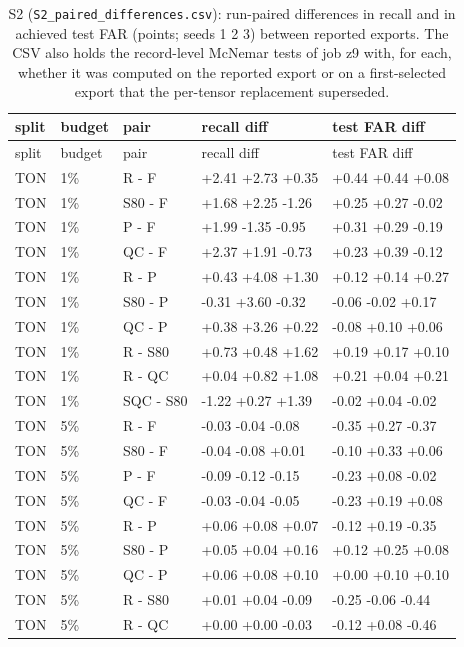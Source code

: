 \documentclass[10pt]{article}
\begin{document}
{\scriptsize
\begin{longtable}{lllll}
\caption{S2 (\texttt{S2\_paired\_differences.csv}): run-paired differences in recall and in achieved test FAR (points; seeds 1 2 3) between reported exports. The CSV also holds the record-level McNemar tests of job z9 with, for each, whether it was computed on the reported export or on a first-selected export that the per-tensor replacement superseded.}\\
\toprule
split & budget & pair & recall diff & test FAR diff \\
\midrule
\endfirsthead
\toprule
split & budget & pair & recall diff & test FAR diff \\
\midrule
\endhead
\bottomrule
\endlastfoot
TON & 1\% & R - F & +2.41 +2.73 +0.35 & +0.44 +0.44 +0.08 \\
TON & 1\% & S80 - F & +1.68 +2.25 -1.26 & +0.25 +0.27 -0.02 \\
TON & 1\% & P - F & +1.99 -1.35 -0.95 & +0.31 +0.29 -0.19 \\
TON & 1\% & QC - F & +2.37 +1.91 -0.73 & +0.23 +0.39 -0.12 \\
TON & 1\% & R - P & +0.43 +4.08 +1.30 & +0.12 +0.14 +0.27 \\
TON & 1\% & S80 - P & -0.31 +3.60 -0.32 & -0.06 -0.02 +0.17 \\
TON & 1\% & QC - P & +0.38 +3.26 +0.22 & -0.08 +0.10 +0.06 \\
TON & 1\% & R - S80 & +0.73 +0.48 +1.62 & +0.19 +0.17 +0.10 \\
TON & 1\% & R - QC & +0.04 +0.82 +1.08 & +0.21 +0.04 +0.21 \\
TON & 1\% & SQC - S80 & -1.22 +0.27 +1.39 & -0.02 +0.04 -0.02 \\
TON & 5\% & R - F & -0.03 -0.04 -0.08 & -0.35 +0.27 -0.37 \\
TON & 5\% & S80 - F & -0.04 -0.08 +0.01 & -0.10 +0.33 +0.06 \\
TON & 5\% & P - F & -0.09 -0.12 -0.15 & -0.23 +0.08 -0.02 \\
TON & 5\% & QC - F & -0.03 -0.04 -0.05 & -0.23 +0.19 +0.08 \\
TON & 5\% & R - P & +0.06 +0.08 +0.07 & -0.12 +0.19 -0.35 \\
TON & 5\% & S80 - P & +0.05 +0.04 +0.16 & +0.12 +0.25 +0.08 \\
TON & 5\% & QC - P & +0.06 +0.08 +0.10 & +0.00 +0.10 +0.10 \\
TON & 5\% & R - S80 & +0.01 +0.04 -0.09 & -0.25 -0.06 -0.44 \\
TON & 5\% & R - QC & +0.00 +0.00 -0.03 & -0.12 +0.08 -0.46 \\

\end{longtable}}
\end{document}
